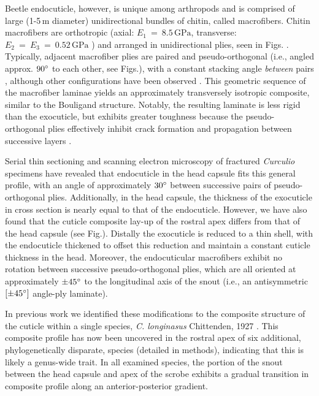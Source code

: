 \documentclass[twocolumn, linenumbers, superscriptaddress]{revtex4-1}
\begin{document}
		Beetle endocuticle, however, is unique among arthropods and is comprised of large (1-5\,{\textmu}m diameter) unidirectional bundles of chitin, called macrofibers.
		Chitin macrofibers are orthotropic (axial: $E_1~=~8.5\,\text{GPa}$, transverse: $ E_2~=~E_3~=~0.52\,\text{GPa}$ \cite{Jansen2016}) and arranged in unidirectional plies, seen in Figs.  \cite{Kamp2010,Kamp2015}.
		Typically, adjacent macrofiber plies are paired and pseudo-orthogonal (i.e., angled approx. $90\degree$ to each other, see Figs.), with a constant stacking angle \emph{between} pairs , although other configurations have been observed \cite{Hepburn1973,Kamp2010}.
		This geometric sequence of the macrofiber laminae yields an approximately transversely isotropic composite, similar to the Bouligand structure.
		Notably, the resulting laminate is less rigid than the exocuticle, but exhibits greater toughness because the pseudo-orthogonal plies effectively inhibit crack formation and propagation between successive layers \cite{Kamp2010,Kamp2015,Hepburn1973}.
		
		Serial thin sectioning and scanning electron microscopy of fractured \textit{Curculio} specimens have revealed that endocuticle in the head capsule fits this general profile, with an angle of approximately $30\degree$ between successive pairs of pseudo-orthogonal plies.
		Additionally, in the head capsule, the thickness of the exocuticle in cross section is nearly equal to that of the endocuticle.
		However, we have also found that the cuticle composite lay-up of the rostral apex differs from that of the head capsule (see Fig.).
		Distally the exocuticle is reduced to a thin shell, with the endocuticle thickened  to offset this reduction and maintain a constant cuticle thickness in the head.
		Moreover, the endocuticular macrofibers exhibit no rotation between successive pseudo-orthogonal plies, which are all oriented at approximately $\pm45\degree$ to the longitudinal axis of the snout (i.e., an antisymmetric $[\pm45\degree]$ angle-ply laminate).
		
		In previous work we identified these modifications to the composite structure of the cuticle within a single species, \textit{C. longinasus} Chittenden, 1927 \cite{Jansen2016, Singh2016}.
		This composite profile has now been uncovered in the rostral apex of six additional, phylogenetically disparate, species (detailed in methods), indicating that this is likely a genus-wide trait.
		In all examined species, the portion of the snout between the head capsule and apex of the scrobe exhibits a gradual transition in composite profile along an anterior-posterior gradient.
		
\end{document}
